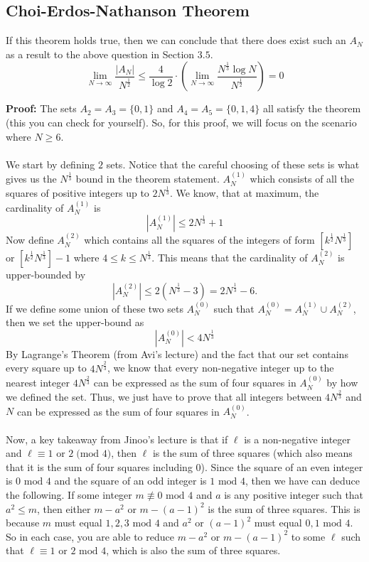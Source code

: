 \documentclass[8pt]{extarticle}
\begin{document}
\subsection{Choi-Erdos-Nathanson Theorem}
If this theorem holds true, then we can conclude that there does exist such an $A_N$ as a result to the above question in Section $3.5$.
$$
\lim_{N\rightarrow\infty} \frac{|A_N|}{N^{\frac{1}{2}}} \leq \frac{4}{\log 2} \cdot \left( \lim_{N\rightarrow\infty}  \frac{N^{\frac{1}{3}} \log N }{N^{\frac{1}{2}}} \right) = 0 
$$
\begin{boxedsection}
    \textbf{Proof:} The sets $A_2 = A_3 = \{0, 1\}$ and $A_4 = A_5 = \{0,1,4\}$ all satisfy the theorem (this you can check for yourself). So, for this proof, we will focus on the scenario where $N \geq 6$. \\
    \\
    We start by defining $2$ sets. Notice that the careful choosing of these sets is what gives us the $N^{\frac{1}{3}}$ bound in the theorem statement. $A_N^{(1)}$ which consists of all the squares of positive integers up to $2N^{\frac{1}{3}}$. We know, that at maximum, the cardinality of $A_N^{(1)}$ is
    $$
    |A_N^{(1)}| \leq 2N^{\frac{1}{3}} + 1
    $$
Now define $A^{(2)}_N$ which contains all the squares of the integers of form $\left[k^{\frac{1}{2}}N^{\frac{1}{3}}\right]$ or $\left[k^{\frac{1}{2}}N^{\frac{1}{3}}\right] - 1$ where $4 \leq k \leq N^{\frac{1}{3}}$. This means that the cardinality of $A^{(2)}_N$ is upper-bounded by
    $$
    |A^{(2)}_N| \leq 2(N^{\frac{1}{3}} - 3) = 2N^{\frac{1}{3}} - 6. 
    $$
    If we define some union of these two sets $A^{(0)}_N$ such that $A^{(0)}_N = A^{(1)}_N \cup A^{(2)}_N$, then we set the upper-bound as
$$
    |A^{(0)}_N| < 4N^{\frac{1}{3}}
$$
By Lagrange's Theorem (from Avi's lecture) and the fact that our set contains every square up to $4N^{\frac{2}{3}}$, we know that every non-negative integer up to the nearest integer $4N^{\frac{2}{3}}$ can be expressed as the sum of four squares in $A_N^{(0)}$ by how we defined the set. Thus, we just have to prove that all integers between $4N^{\frac{2}{3}}$ and $N$ can be expressed as the sum of four squares in $A_N^{(0)}$.\\
\\
Now, a key takeaway from Jinoo's lecture is that if $\ell$ is a non-negative integer and $\ell \equiv 1 \text{ or } 2 \;\text{(mod 4)}$, then $\ell$ is the sum of three squares (which also means that it is the sum of four squares including $0$). Since the square of an even integer is $0 \text{ mod } 4$ and the square of an odd integer is $1 \text{ mod } 4$, then we have can deduce the following. If some integer $m \nequiv 0 \text{ mod } 4$ and $a$ is any positive integer such that $a^2 \leq m$, then either $m-a^2$ or $m-(a-1)^2$ is the sum of three squares. This is because $m$ must equal $1,2,3 \text{ mod }4$ and $a^2$ or $(a-1)^2$ must equal $0,1 \text{ mod } 4$. So in each case, you are able to reduce $m-a^2$ or $m-(a-1)^2$ to some $\ell$ such that $\ell \equiv 1 \text{ or } 2 \text{ mod } 4$, which is also the sum of three squares.\\

\end{boxedsection}
\end{document}
